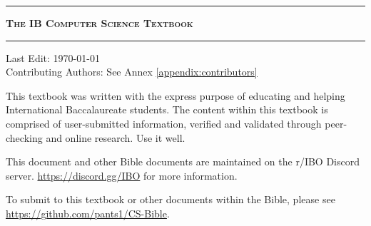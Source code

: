 \documentclass[12pt,a4paper]{article}
\begin{document}
\begin{titlepage} 

\vspace*{25mm}
\centering 

\rule{\textwidth}{1.25pt}
{\Huge \textbf{\textsc{The IB Computer Science Textbook}}\\} 
\rule{\textwidth}{1.25pt}

\vspace{10mm}
\begin{flushleft}
\large{Last Edit: {\today} \\
Contributing Authors: See Annex \ref{appendix:contributors}\\

\medskip

This textbook was written with the express purpose of educating and helping International Baccalaureate students. The content within this textbook is comprised of user-submitted information, verified and validated through peer-checking and online research. Use it well.\\

\medskip

This document and other Bible documents are maintained on the r/IBO Discord server.
\url{https://discord.gg/IBO} for more information.\\

\medskip

To submit to this textbook or other documents within the Bible, please see \url{https://github.com/pants1/CS-Bible}.}
\end{flushleft}


\end{titlepage}


\clearpage

\tableofcontents

\clearpage

\end{document}

